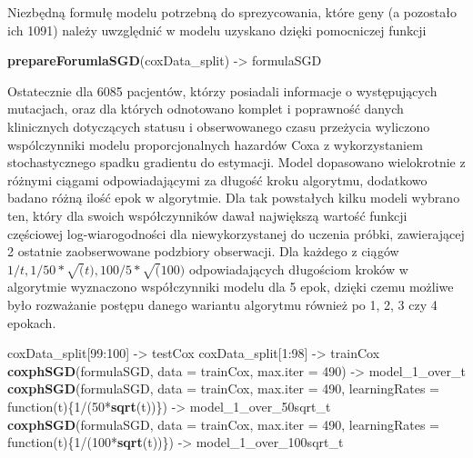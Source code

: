 \documentclass[]{article}
\newenvironment{Shaded}{\begin{snugshade}}{\end{snugshade}}
\newcommand{\KeywordTok}[1]{\textcolor[rgb]{0.13,0.29,0.53}{\textbf{{#1}}}}
\newcommand{\DataTypeTok}[1]{\textcolor[rgb]{0.13,0.29,0.53}{{#1}}}
\newcommand{\DecValTok}[1]{\textcolor[rgb]{0.00,0.00,0.81}{{#1}}}
\newcommand{\StringTok}[1]{\textcolor[rgb]{0.31,0.60,0.02}{{#1}}}
\newcommand{\NormalTok}[1]{{#1}}
\begin{document}
Niezbędną formułę modelu potrzebną do sprezycowania, które geny (a
pozostało ich 1091) należy uwzględnić w modelu uzyskano dzięki
pomocniczej funkcji

\begin{Shaded}
\begin{Highlighting}[]
\KeywordTok{prepareForumlaSGD}\NormalTok{(coxData_split) ->}\StringTok{ }\NormalTok{formulaSGD}
\end{Highlighting}
\end{Shaded}

Ostatecznie dla 6085 pacjentów, którzy posiadali informacje o
występujących mutacjach, oraz dla których odnotowano komplet i
poprawność danych klinicznych dotyczących statusu i obserwowanego czasu
przeżycia wyliczono wspólczynniki modelu proporcjonalnych hazardów Coxa
z wykorzystaniem stochastycznego spadku gradientu do estymacji. Model
dopasowano wielokrotnie z różnymi ciągami odpowiadającymi za długość
kroku algorytmu, dodatkowo badano różną ilość epok w algorytmie. Dla tak
powstałych kilku modeli wybrano ten, który dla swoich współczynników
dawał największą wartość funkcji częściowej log-wiarogodności dla
niewykorzystanej do uczenia próbki, zawierającej 2 ostatnie
zaobserwowane podzbiory obserwacji. Dla każdego z ciągów
\(1/t, 1/50*\sqrt(t), 100/5*\sqrt(100)\) odpowiadających długościom
kroków w algorytmie wyznaczono współczynniki modelu dla 5 epok, dzięki
czemu możliwe było rozważanie postępu danego wariantu algorytmu również
po 1, 2, 3 czy 4 epokach.

\begin{Shaded}
\begin{Highlighting}[]
\NormalTok{coxData_split[}\DecValTok{99}\NormalTok{:}\DecValTok{100}\NormalTok{] ->}\StringTok{ }\NormalTok{testCox}
\NormalTok{coxData_split[}\DecValTok{1}\NormalTok{:}\DecValTok{98}\NormalTok{] ->}\StringTok{ }\NormalTok{trainCox}
\KeywordTok{coxphSGD}\NormalTok{(formulaSGD, }\DataTypeTok{data =} \NormalTok{trainCox, }\DataTypeTok{max.iter =} \DecValTok{490}\NormalTok{) ->}\StringTok{ }\NormalTok{model_1_over_t}
\KeywordTok{coxphSGD}\NormalTok{(formulaSGD, }\DataTypeTok{data =} \NormalTok{trainCox, }\DataTypeTok{max.iter =} \DecValTok{490}\NormalTok{,}
         \DataTypeTok{learningRates =} \NormalTok{function(t)\{}\DecValTok{1}\NormalTok{/(}\DecValTok{50}\NormalTok{*}\KeywordTok{sqrt}\NormalTok{(t))\}) ->}\StringTok{ }\NormalTok{model_1_over_50sqrt_t}
\KeywordTok{coxphSGD}\NormalTok{(formulaSGD, }\DataTypeTok{data =} \NormalTok{trainCox, }\DataTypeTok{max.iter =} \DecValTok{490}\NormalTok{,}
         \DataTypeTok{learningRates =} \NormalTok{function(t)\{}\DecValTok{1}\NormalTok{/(}\DecValTok{100}\NormalTok{*}\KeywordTok{sqrt}\NormalTok{(t))\}) ->}\StringTok{ }\NormalTok{model_1_over_100sqrt_t}
\end{Highlighting}
\end{Shaded}
\end{document}
